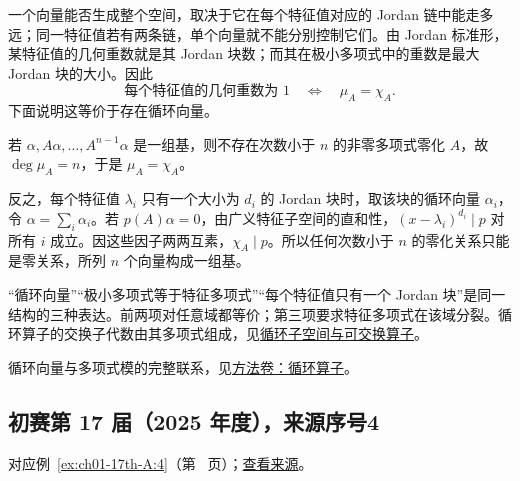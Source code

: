 \documentclass[UTF8,12pt,a4paper,fontset=fandol]{ctexart}
\begin{document}
\begin{solve}

一个向量能否生成整个空间，取决于它在每个特征值对应的 Jordan 链中能走多远；同一特征值若有两条链，单个向量就不能分别控制它们。由 Jordan 标准形，某特征值的几何重数就是其 Jordan 块数；而其在极小多项式中的重数是最大 Jordan 块的大小。因此
\[
\text{每个特征值的几何重数为 }1
\quad\Longleftrightarrow\quad \mu_A=\chi_A.
\]
下面说明这等价于存在循环向量。

若 $\alpha,A\alpha,\ldots,A^{n-1}\alpha$ 是一组基，则不存在次数小于 $n$ 的非零多项式零化 $A$，故 $\deg\mu_A=n$，于是 $\mu_A=\chi_A$。

反之，每个特征值 $\lambda_i$ 只有一个大小为 $d_i$ 的 Jordan 块时，取该块的循环向量 $\alpha_i$，令 $\alpha=\sum_i\alpha_i$。若 $p(A)\alpha=0$，由广义特征子空间的直和性，$(x-\lambda_i)^{d_i}\mid p$ 对所有 $i$ 成立。因这些因子两两互素，$\chi_A\mid p$。所以任何次数小于 $n$ 的零化关系只能是零关系，所列 $n$ 个向量构成一组基。

\end{solve}

\begin{remark}[方法与条件]

“循环向量”“极小多项式等于特征多项式”“每个特征值只有一个 Jordan 块”是同一结构的三种表达。前两项对任意域都等价；第三项要求特征多项式在该域分裂。循环算子的交换子代数由其多项式组成，见\hyperref[pr:ch01-17th-A:4]{循环子空间与可交换算子}。

循环向量与多项式模的完整联系，见\hyperref[app:linear-cyclic]{方法卷：循环算子}。

\end{remark}

\subsection{初赛第 17 届（2025 年度），来源序号4}\label{ans:ch01-17th-A:4}\label{pr:ch01-17th-A:4}

对应例~\ref{ex:ch01-17th-A:4}（第~\pageref{ex:ch01-17th-A:4} 页）；\href{https://github.com/lzxcr/cmc-mathematics/blob/64916fa1fdbc3e444a652eca204d5669058ee321/src/problems/preliminary/17/04.md}{查看来源}。
\end{document}
